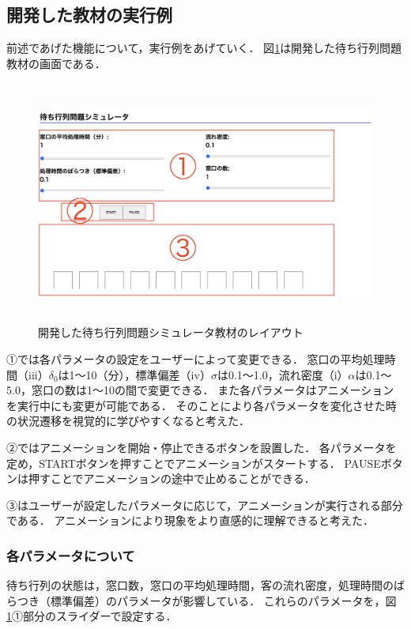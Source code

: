 \documentclass[12pt,a4j]{ltjsarticle}
\begin{document}
\subsection{開発した教材の実行例}
前述であげた機能について，実行例をあげていく．
図\ref{fig:layout_ex}は開発した待ち行列問題教材の画面である．
\begin{figure}[h]
\begin{center}
\includegraphics[height = 80mm ] {figures/layout0113.pdf}
\caption{開発した待ち行列問題シミュレータ教材のレイアウト}
\label{fig:layout_ex}
\end{center}
\end{figure}

①では各パラメータの設定をユーザーによって変更できる．
窓口の平均処理時間（iii）$\delta_0$は1〜10（分），標準偏差（iv）$\sigma$は0.1〜1.0，流れ密度（i）$\alpha$は0.1〜5.0，窓口の数は1〜10の間で変更できる．
また各パラメータはアニメーションを実行中にも変更が可能である．
そのことにより各パラメータを変化させた時の状況遷移を視覚的に学びやすくなると考えた．

②ではアニメーションを開始・停止できるボタンを設置した．
各パラメータを定め，STARTボタンを押すことでアニメーションがスタートする．
PAUSEボタンは押すことでアニメーションの途中で止めることができる．

③はユーザーが設定したパラメータに応じて，アニメーションが実行される部分である．
アニメーションにより現象をより直感的に理解できると考えた．


\clearpage

\subsubsection{各パラメータについて}
待ち行列の状態は，窓口数，窓口の平均処理時間，客の流れ密度，処理時間のばらつき（標準偏差）のパラメータが影響している．
これらのパラメータを，図\ref{fig:layout_ex}①部分のスライダーで設定する．
\end{document}
